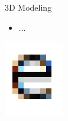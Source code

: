 \documentclass{lug}
\newcommand{\splitslide}[4]{
    \noindent
    \begin{minipage}{#1 \textwidth - #2 }
        #3
    \end{minipage}%
    \hspace{ \dimexpr #2 * 2 \relax }%
    \begin{minipage}{\textwidth - #1 \textwidth - #2 }
        #4
    \end{minipage}
}
\begin{document}
\begin{frame}{3D Modeling}
    \splitslide{0.65}{.7em}{
        \small
        \begin{itemize}
            \item ...
        \end{itemize}
    }{
        \includegraphics[width=\textwidth]{graphics/subpixel_e}
    }
\end{frame}
\end{document}
